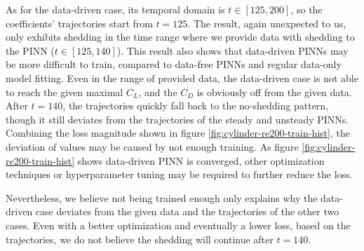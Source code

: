 As for the data-driven case, its temporal domain is $t\in[125, 200]$, so the coefficients' trajectories start from $t=125$.
The result, again unexpected to us, only exhibits shedding in the time range where we provide data with shedding to the PINN ($t\in[125, 140]$).
This result also shows that data-driven PINNs may be more difficult to train, compared to data-free PINNs and regular data-only model fitting.
Even in the range of provided data, the data-driven case is not able to reach the given maximal $C_L$, and the $C_D$ is obviously off from the given data.
After $t=140$, the trajectories quickly fall back to the no-shedding pattern, though it still deviates from the trajectories of the steady and unsteady PINNs.
Combining the loss magnitude shown in figure \ref{fig:cylinder-re200-train-hist}, the deviation of values may be caused by not enough training.
As figure \ref{fig:cylinder-re200-train-hist} shows data-driven PINN is converged, other optimization techniques or hyperparameter tuning may be required to further reduce the loss.

Nevertheless, we believe not being trained enough only explains why the data-driven case deviates from the given data and the trajectories of the other two cases.
Even with a better optimization and eventually a lower loss, based on the trajectories, we do not believe the shedding will continue after $t=140$.

